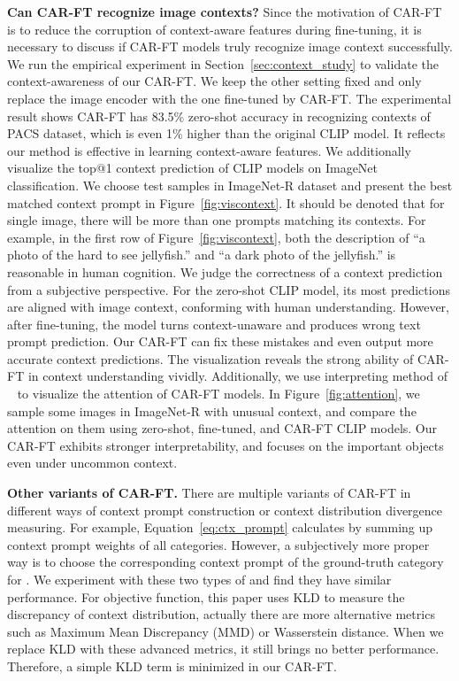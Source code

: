 \documentclass[pdflatex,sn-basic,iicol]{sn-jnl}
\theoremstyle{thmstyleone}\newtheorem{theorem}{Theorem}\newtheorem{proposition}[theorem]{Proposition}
\theoremstyle{thmstyletwo}\newtheorem{example}{Example}\newtheorem{remark}{Remark}
\theoremstyle{thmstylethree}\newtheorem{definition}{Definition}
\begin{document}
\noindent\textbf{Can CAR-FT recognize image contexts? } Since the motivation of CAR-FT is to reduce the corruption of context-aware features during fine-tuning, it is necessary to discuss if CAR-FT models truly recognize image context successfully. We run the empirical experiment in Section~\ref{sec:context_study} to validate the context-awareness of our CAR-FT. We keep the other setting fixed and only replace the image encoder with the one fine-tuned by CAR-FT. The experimental result shows CAR-FT has 83.5\% zero-shot accuracy in recognizing contexts of PACS dataset, which is even 1\% higher than the original CLIP model. It reflects our method is effective in learning context-aware features. We additionally visualize the top@1 context prediction of CLIP models on ImageNet classification. We choose test samples in  ImageNet-R dataset and present the best matched context prompt in Figure~\ref{fig:viscontext}. It should be denoted that for single image, there will be more than one prompts matching its contexts. For example, in the first row of Figure~\ref{fig:viscontext}, both the description of ``a photo of the hard to see jellyfish.'' and ``a dark photo of the jellyfish.'' is reasonable in human cognition. We judge the correctness of a context prediction from a subjective perspective. For the zero-shot CLIP model, its most predictions are aligned with image context, conforming with human understanding. However, after fine-tuning, the model turns context-unaware and produces wrong text prompt prediction. Our CAR-FT can fix these mistakes and even output more accurate context predictions. The visualization reveals the strong ability of CAR-FT in context understanding vividly. Additionally, we use interpreting method of ~\cite{chefer2021generic} to visualize the attention of CAR-FT models. In Figure~\ref{fig:attention}, we sample some images in ImageNet-R with unusual context, and compare the attention on them using zero-shot, fine-tuned, and CAR-FT CLIP models. Our CAR-FT exhibits stronger interpretability, and focuses on the important objects even under uncommon context. 

\noindent\textbf{Other variants of CAR-FT.} There are multiple variants of CAR-FT in different ways of context prompt construction or context distribution divergence measuring. For example, Equation~\ref{eq:ctx_prompt} calculates  by summing up context prompt weights of all categories. However, a subjectively more proper way is to choose the corresponding context prompt of 
the ground-truth category for . We experiment with these two types of  and find they have similar performance. For objective function, this paper uses KLD to measure the discrepancy of context distribution, actually there are more alternative metrics such as Maximum Mean Discrepancy (MMD) or Wasserstein distance. When we replace KLD with these advanced metrics, it still brings no better performance. Therefore, a simple KLD term is minimized in our CAR-FT.  
\end{document}

